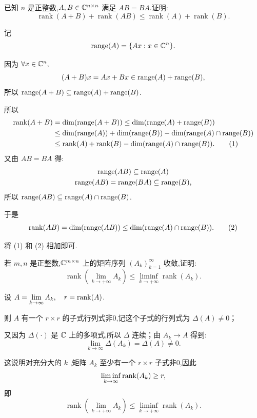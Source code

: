 \begin{problem}[选做]
已知 $n$ 是正整数,$A,B\in\mathbb{C}^{n\times n}$ 满足 $AB=BA$.证明:
\[
    \operatorname{rank}(A+B)+\operatorname{rank}(AB)\le \operatorname{rank}(A)+\operatorname{rank}(B).
\]
\begin{solution}
    记
    \[
        \operatorname{range}(A) = \{Ax:x\in \mathbb{C}^n\}.
    \]

    因为 $\forall x \in \mathbb{C}^n,$ 
    \[ (A+B)x = Ax + Bx \in \operatorname{range}(A) + \operatorname{range}(B),\]
    所以 $\operatorname{range}(A+B) \subseteq \operatorname{range}(A) + \operatorname{range}(B)$. 

    所以
    \begin{align*}
        \operatorname{rank}(A+B) & = \dim(\operatorname{range}(A+B)) \le \dim(\operatorname{range}(A) + \operatorname{range}(B)) \\
        &\le \dim(\operatorname{range}(A)) + \dim(\operatorname{range}(B)) - \dim(\operatorname{range}(A) \cap \operatorname{range}(B)) \\
        &\le \operatorname{rank}(A) + \operatorname{rank}(B) - \dim(\operatorname{range}(A) \cap \operatorname{range}(B)). \tag{1}
    \end{align*}
    又由 $AB = BA$ 得:
    \begin{gather*}
        \operatorname{range}(AB) \subseteq \operatorname{range}(A) \\
        \operatorname{range}(AB) = \operatorname{range}(BA) \subseteq \operatorname{range}(B),
    \end{gather*}
    所以 $\operatorname{range}(AB) \subseteq \operatorname{range}(A) \cap \operatorname{range}(B)$.
    
    于是
    \begin{equation}
        \operatorname{rank}(AB) = \dim(\operatorname{range}(AB)) \le \dim(\operatorname{range}(A) \cap \operatorname{range}(B)). \tag{2}
    \end{equation}

    将 (1) 和 (2) 相加即可.
\end{solution}
\end{problem}

\begin{problem}[选做]
若 $m,n$ 是正整数,$\mathbb{C}^{m\times n}$ 上的矩阵序列 $\left(A_k\right)_{k=1}^{\infty}$ 收敛,证明:
\[
    \operatorname{rank}\left(\lim_{k\to+\infty} A_k\right)\le \liminf_{k\to+\infty}\operatorname{rank}(A_k).
\]
\begin{solution}
    设 $A = \lim \limits_{k \to \infty} A_k, \quad r = \operatorname{rank}(A)$.
    
    则 $A$ 有一个 $r \times r$ 的子式行列式非0,记这个子式的行列式为 $\Delta(A) \ne 0$；
    
    又因为 $\Delta(\cdot)$ 是 $\mathbb{C}$ 上的多项式,所以 $\Delta$ 连续；由 $A_k \to A$ 得到:
    \[
        \lim \limits_{k \to \infty} \Delta(A_k) = \Delta(A) \ne 0.
    \]

    这说明对充分大的 $k$ ,矩阵 $A_k$ 至少有一个 $r \times r$ 子式非0,因此
    \[
        \liminf_{k \to \infty} \operatorname{rank}(A_k) \ge r,
    \]
    即
    \[
    \operatorname{rank}\left(\lim_{k\to+\infty} A_k\right)\le \liminf_{k\to+\infty}\operatorname{rank}(A_k).
    \]
\end{solution}
\end{problem}

